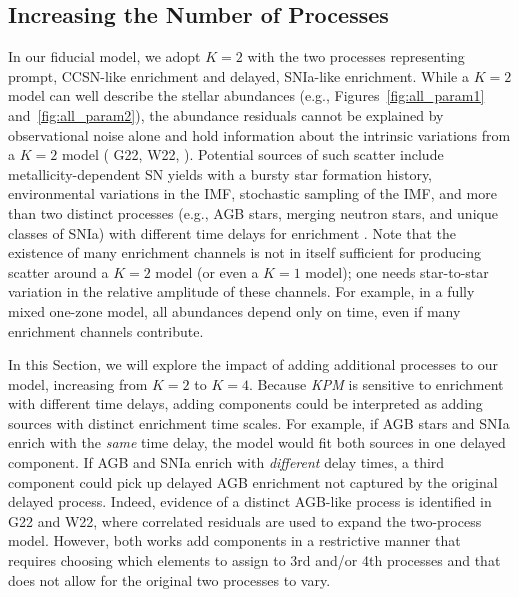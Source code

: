 \documentclass[modern]{aastex631}
\newcommand{\name}{\textsl{KPM}}
\begin{document}
\subsection{Increasing the Number of Processes} \label{subsec:k=4}

In our fiducial model, we adopt $K=2$ with the two processes representing prompt, CCSN-like enrichment and delayed, SNIa-like enrichment. While a $K=2$ model can well describe the stellar abundances (e.g., Figures~\ref{fig:all_param1} and~\ref{fig:all_param2}), the abundance residuals cannot be explained by observational noise alone and hold information about the intrinsic variations from a $K=2$ model (\citealp{ness2019} G22, W22, \citealp{ting2022, ratcliffe2023}). Potential sources of such scatter include metallicity-dependent SN yields with a bursty star formation history, environmental variations in the IMF, stochastic sampling of the IMF, and more than two distinct processes (e.g., AGB stars, merging neutron stars, and unique classes of SNIa) with different time delays for enrichment \citep[e.g.][]{belokurov2022, griffith2023}. Note that the existence of many enrichment channels is not in itself sufficient for producing scatter around a $K=2$ model (or even a $K=1$ model); one needs star-to-star variation in the relative amplitude of these channels. For example, in a fully mixed one-zone model, all abundances depend only on time, even if many enrichment channels contribute.

In this Section, we will explore the impact of adding additional processes to our model, increasing from $K=2$ to $K=4$. Because \name{} is sensitive to enrichment with different time delays, adding components could be interpreted as adding sources with distinct enrichment time scales. For example, if AGB stars and SNIa enrich with the \textit{same} time delay, the model would fit both sources in one delayed component. If AGB and SNIa enrich with \textit{different} delay times, a third component could pick up delayed AGB enrichment not captured by the original delayed process. Indeed, evidence of a distinct AGB-like process is identified in G22 and W22, where correlated residuals are used to expand the two-process model. However, both works add components in a restrictive manner that requires choosing which elements to assign to 3rd and/or 4th processes and that does not allow for the original two processes to vary. 
\end{document}
